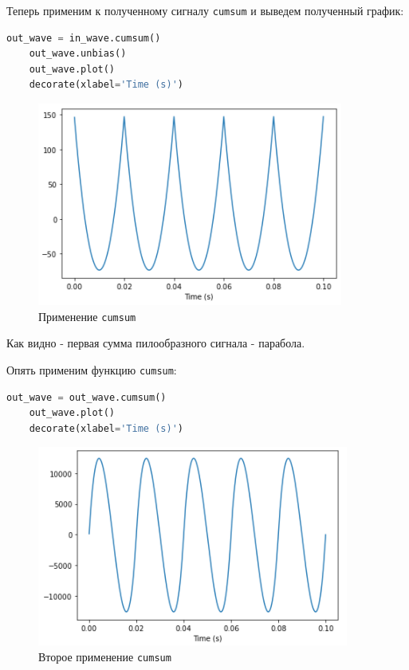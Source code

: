 \documentclass[a4paper]{article}
\begin{document}
            Теперь применим к полученному сигналу \texttt{cumsum} и выведем полученный график:
            
\begin{lstlisting}[language=Python, caption= Применение \texttt{cumsum}]
    out_wave = in_wave.cumsum()
    out_wave.unbias()
    out_wave.plot()
    decorate(xlabel='Time (s)')
\end{lstlisting}
            
            \begin{figure}[H]
                \centering
                \includegraphics{ex_4_2.png}
                \caption{Применение \texttt{cumsum}}
                \label{fig:ex_4_2}
            \end{figure}
            
            Как видно - первая сумма пилообразного сигнала - парабола.
            
            Опять применим функцию \texttt{cumsum}:
            
\begin{lstlisting}[language=Python, caption= Второе применение \texttt{cumsum}]
    out_wave = out_wave.cumsum()
    out_wave.plot()
    decorate(xlabel='Time (s)')
\end{lstlisting}
            
            \begin{figure}[H]
                \centering
                \includegraphics{ex_4_3.png}
                \caption{Второе применение \texttt{cumsum}}
                \label{fig:ex_4_3}
            \end{figure}
            
\end{document}
